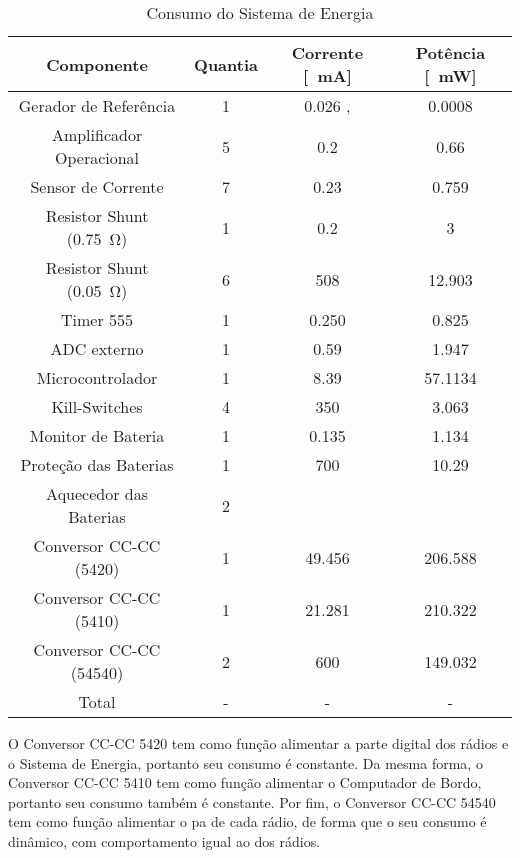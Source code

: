 \begin{table}[!htpb]
\centering
\begin{tabular}{c c c c}
\\ \hline
Componente & Quantia & Corrente [\SI{}{\milli\ampere}] & Potência [\SI{}{\milli\watt}] \\ \hline \hline
Gerador de Referência & 1 & 0.026 \cite{ref5030}, \cite{msp430f6659} & 0.0008 \cite{ref5030} \\
Amplificador Operacional & 5 & 0.2 \cite{tlv341} & 0.66 \\
Sensor de Corrente & 7 & 0.23 \cite{max9934} & 0.759 \\
Resistor Shunt (\SI{0.75}{\ohm}) & 1 & 0.2 & 3 \\
Resistor Shunt (\SI{0.05}{\ohm}) & 6 & 508 & 12.903 \\
Timer 555 & 1 & 0.250 \cite{lmc555} & 0.825 \\
ADC externo & 1 & 0.59 \cite{ads1248} & 1.947 \\
Microcontrolador & 1 & 8.39 \cite{msp430f6659} & 57.1134 \cite{msp430f6659} \\
Kill-Switches & 4 & 350 & 3.063 \cite{si4403} \\
Monitor de Bateria & 1 & 0.135 \cite{ds2775} & 1.134 \cite{ds2775} \\
Proteção das Baterias & 1 & 700 & 10.29 \cite{fds6898az} \\
Aquecedor das Baterias & 2 & & \\
Conversor CC-CC (5420) & 1 & 49.456 & 206.588 \cite{tps5420} \\
Conversor CC-CC (5410) & 1 & 21.281 & 210.322 \cite{tps5410} \\
Conversor CC-CC (54540) & 2 & 600 & 149.032 \cite{tps54540} \\ \hline
Total & - & - & - \\ \hline
\end{tabular}
\caption{Consumo do Sistema de Energia}
\label{consumo_eps}
\end{table}

O Conversor CC-CC 5420 tem como função alimentar a parte digital dos rádios e o Sistema de Energia, portanto seu consumo é constante. Da mesma forma, o Conversor CC-CC 5410 tem como função alimentar o Computador de Bordo, portanto seu consumo também é constante. Por fim, o Conversor CC-CC 54540 tem como função alimentar o \gls{pa} de cada rádio, de forma que o seu consumo é dinâmico, com comportamento igual ao dos rádios.